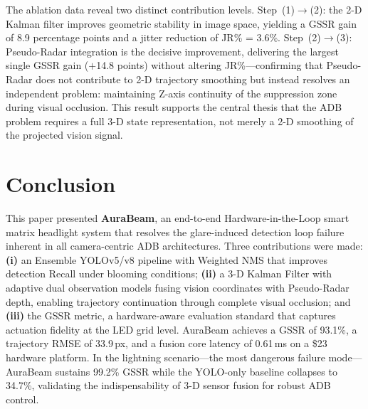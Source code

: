 \documentclass[pdflatex,sn-mathphys-num]{sn-jnl}%
\theoremstyle{thmstyleone}%
\theoremstyle{thmstyletwo}%
\theoremstyle{thmstylethree}%
\begin{document}
The ablation data reveal two distinct contribution levels.
Step~(1)$\to$(2): the 2-D Kalman filter improves geometric stability
in image space, yielding a GSSR gain of 8.9 percentage points and a
jitter reduction of JR\% = 3.6\%.
Step~(2)$\to$(3): Pseudo-Radar integration is the decisive improvement,
delivering the largest single GSSR gain ($+$14.8 points) without
altering JR\%---confirming that Pseudo-Radar does not contribute to
2-D trajectory smoothing but instead resolves an independent problem:
maintaining Z-axis continuity of the suppression zone during visual
occlusion. This result supports the central thesis that the ADB
problem requires a full 3-D state representation, not merely a 2-D
smoothing of the projected vision signal.

\section{Conclusion}
\label{sec:conclusion}

This paper presented \textbf{AuraBeam}, an end-to-end
Hardware-in-the-Loop smart matrix headlight system that resolves the
glare-induced detection loop failure inherent in all camera-centric ADB
architectures. Three contributions were made: \textbf{(i)} an Ensemble
YOLOv5/v8 pipeline with Weighted NMS that improves detection Recall
under blooming conditions; \textbf{(ii)} a 3-D Kalman Filter with
adaptive dual observation models fusing vision coordinates with
Pseudo-Radar depth, enabling trajectory continuation through complete
visual occlusion; and \textbf{(iii)} the GSSR metric, a
hardware-aware evaluation standard that captures actuation fidelity at
the LED grid level. AuraBeam achieves a GSSR of 93.1\%, a trajectory
RMSE of 33.9\,px, and a fusion core latency of 0.61\,ms on a \$23
hardware platform. In the lightning scenario---the most dangerous
failure mode---AuraBeam sustains 99.2\% GSSR while the YOLO-only
baseline collapses to 34.7\%, validating the indispensability of 3-D
sensor fusion for robust ADB control.
\end{document}
